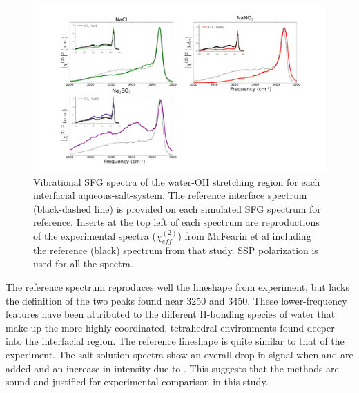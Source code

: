 \begin{figure}[h!]
\begin{center}
	\includegraphics[scale=1.0]{images/sfg-spectra.png}
	\caption{Vibrational SFG spectra of the water-OH stretching region for each interfacial aqueous-salt-\ctc system. The reference \ctcwat interface spectrum (black-dashed line) is provided on each simulated SFG spectrum for reference. Inserts at the top left of each spectrum are reproductions of the experimental spectra ($\chi^{(2)}_{eff}$) from McFearin et al\cite{McFearin2009} including the reference (black) spectrum from that study. SSP polarization is used for all the spectra.}
	\label{fig:sfg-spectra}
\end{center}
\end{figure}


The reference \ctcwat spectrum reproduces well the lineshape from experiment, but lacks the definition of the two peaks found near 3250 and 3450\cm. These lower-frequency features have been attributed to the different H-bonding species of water that make up the more highly-coordinated, tetrahedral environments found deeper into the interfacial region. The reference \ctcwat lineshape is quite similar to that of the experiment. The salt-solution spectra show an overall drop in signal when \cl and \nit are added and an increase in intensity due to \sul. This suggests that the methods are sound and justified for experimental comparison in this study.

